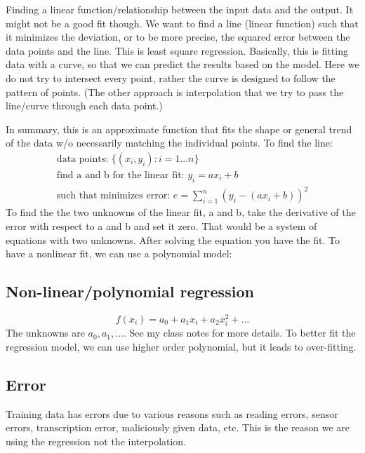 \documentclass[12pt]{report}
\begin{document}
Finding a linear function/relationship between the input data and the output. It might not be a good fit though. We want to find a line (linear function) such that it minimizes the deviation, or to be more precise, the squared error between the data points and the line. This is least square regression. Basically, this is fitting data with a curve, so that we can predict the results based on the model. Here we do not try to intersect every point, rather the curve is designed to follow the pattern of points. (The other approach is interpolation that we try to pass the line/curve through each data point.)

In summary, this is an approximate function that fits the shape or general trend of the data w/o necessarily matching the individual points.
To find the line:
\begin{equation}
	\begin{split}
	\text{data points:  } \{(x_i, y_i): i=1 ... n \} \\
	\text{find a and b for the linear fit:  } y_i = a x_i + b \\
	\text{such that minimizes error:  } e = \sum_{i=1}^n (y_i -(ax_i+b))^2
	\end{split}
\end{equation}
To find the the two unknowns of the linear fit, a and b, take the derivative of the error with respect to a and b and set it zero. That would be a system of equations with two unknowns. After solving the equation you have the fit. To have a nonlinear fit, we can use a polynomial model:

\subsection{Non-linear/polynomial regression}
\begin{equation}
	f(x_i) = a_0 + a_1 x_i + a_2 x_i^2 + ...
\end{equation}
The unknowns are $a_0, a_1, ...$.
See my class notes for more details.
To better fit the regression model, we can use higher order polynomial, but it leads to over-fitting.


\subsection{Error}
Training data has errors due to various reasons such as reading errors, sensor errors, transcription error, maliciously given data, etc. This is the reason we are using the regression not the interpolation.
\end{document}

